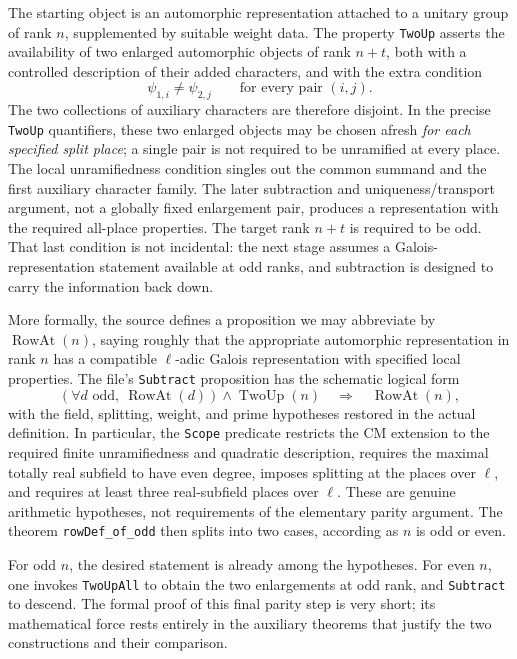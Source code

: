 \documentclass[11pt,openany,oneside]{scrbook}
\theoremstyle{definition}
\theoremstyle{remark}
\begin{document}
The starting object is an automorphic representation attached to a unitary group of rank $n$, supplemented by suitable weight data. The property \texttt{TwoUp} asserts the availability of two enlarged automorphic objects of rank $n+t$, both with a controlled description of their added characters, and with the extra condition
\[
\psi_{1,i}\ne\psi_{2,j}\qquad\text{for every pair }(i,j).
\]
The two collections of auxiliary characters are therefore disjoint. In the precise \texttt{TwoUp} quantifiers, these two enlarged objects may be chosen afresh \emph{for each specified split place}; a single pair is not required to be unramified at every place. The local unramifiedness condition singles out the common summand and the first auxiliary character family. The later subtraction and uniqueness/transport argument, not a globally fixed enlargement pair, produces a representation with the required all-place properties. The target rank $n+t$ is required to be odd. That last condition is not incidental: the next stage assumes a Galois-representation statement available at odd ranks, and subtraction is designed to carry the information back down.

More formally, the source defines a proposition we may abbreviate by $\operatorname{RowAt}(n)$, saying roughly that the appropriate automorphic representation in rank $n$ has a compatible $\ell$-adic Galois representation with specified local properties. The file's \texttt{Subtract} proposition has the schematic logical form
\begin{equation}\label{eq:subtract}
\left(\forall d\text{ odd},\ \operatorname{RowAt}(d)\right)
\land \operatorname{TwoUp}(n)
\quad\Longrightarrow\quad\operatorname{RowAt}(n),
\end{equation}
with the field, splitting, weight, and prime hypotheses restored in the actual definition. In particular, the \texttt{Scope} predicate restricts the CM extension to the required finite unramifiedness and quadratic description, requires the maximal totally real subfield to have even degree, imposes splitting at the places over $\ell$, and requires at least three real-subfield places over $\ell$. These are genuine arithmetic hypotheses, not requirements of the elementary parity argument. The theorem \texttt{rowDef\_of\_odd} then splits into two cases, according as $n$ is odd or even.

For odd $n$, the desired statement is already among the hypotheses. For even $n$, one invokes \texttt{TwoUpAll} to obtain the two enlargements at odd rank, and \texttt{Subtract} to descend. The formal proof of this final parity step is very short; its mathematical force rests entirely in the auxiliary theorems that justify the two constructions and their comparison.
\end{document}
